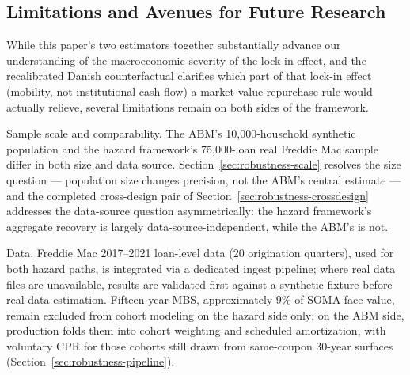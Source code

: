 \documentclass[12pt]{article}
\begin{document}
\subsection{Limitations and Avenues for Future Research}\label{sec:limitations}

While this paper's two estimators together substantially advance our understanding of the macroeconomic severity of the lock-in effect, and the recalibrated Danish counterfactual clarifies which part of that lock-in effect (mobility, not institutional cash flow) a market-value repurchase rule would actually relieve, several limitations remain on both sides of the framework.

Sample scale and comparability. The ABM's 10,000-household synthetic population and the hazard framework's 75,000-loan real Freddie Mac sample differ in both size and data source. Section~\ref{sec:robustness-scale} resolves the size question --- population size changes precision, not the ABM's central estimate --- and the completed cross-design pair of Section~\ref{sec:robustness-crossdesign} addresses the data-source question asymmetrically: the hazard framework's aggregate recovery is largely data-source-independent, while the ABM's is not.

Data. Freddie Mac 2017--2021 loan-level data (20 origination quarters), used for both hazard paths, is integrated via a dedicated ingest pipeline; where real data files are unavailable, results are validated first against a synthetic fixture before real-data estimation. Fifteen-year MBS, approximately 9\% of SOMA face value, remain excluded from cohort modeling on the hazard side only; on the ABM side, production folds them into cohort weighting and scheduled amortization, with voluntary CPR for those cohorts still drawn from same-coupon 30-year surfaces (Section~\ref{sec:robustness-pipeline}).
\end{document}
